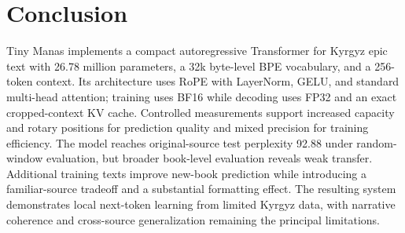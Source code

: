 \documentclass{article}
\begin{document}
\section{Conclusion}
Tiny Manas implements a compact autoregressive Transformer for Kyrgyz epic text with 26.78 million parameters, a 32k byte-level BPE vocabulary, and a 256-token context. Its architecture uses RoPE with LayerNorm, GELU, and standard multi-head attention; training uses BF16 while decoding uses FP32 and an exact cropped-context KV cache. Controlled measurements support increased capacity and rotary positions for prediction quality and mixed precision for training efficiency. The model reaches original-source test perplexity 92.88 under random-window evaluation, but broader book-level evaluation reveals weak transfer. Additional training texts improve new-book prediction while introducing a familiar-source tradeoff and a substantial formatting effect. The resulting system demonstrates local next-token learning from limited Kyrgyz data, with narrative coherence and cross-source generalization remaining the principal limitations.
\end{document}
